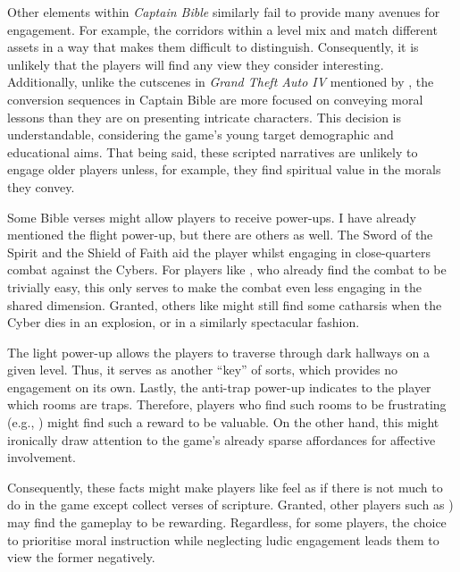 Other elements within \textit{Captain Bible} \parencite{engelbrite_captain_1994} similarly fail to provide many avenues for engagement. For example, the corridors within a level mix and match different assets in a way that makes them difficult to distinguish. Consequently, it is unlikely that the players will find any view they consider interesting. Additionally, unlike the cutscenes in \textit{Grand Theft Auto IV} \parencite{rockstar_north_grand_2008}  mentioned by \textcite[163]{calleja_in_game_2011}, the conversion sequences in Captain Bible are more focused on conveying moral lessons than they are on presenting intricate characters. This decision is understandable, considering the game's young target demographic and educational aims. That being said, these scripted narratives are unlikely to engage older players unless, for example, they find spiritual value in the morals they convey.

Some Bible verses might allow players to receive power-ups. I have already mentioned the flight power-up, but there are others as well. The Sword of the Spirit and the Shield of Faith aid the player whilst engaging in close-quarters combat against the Cybers. For players like \textcite{ace101_an_2013}, who already find the combat to be trivially easy, this only serves to make the combat even less engaging in the shared dimension. Granted, others like \textcite{annk526_captain_2024} might still find some catharsis when the Cyber dies in an explosion, or in a similarly spectacular fashion. 

The light power-up allows the players to traverse through dark hallways on a given level. Thus, it serves as another ``key'' of sorts, which provides no engagement on its own. Lastly, the anti-trap power-up indicates to the player which rooms are traps. Therefore, players who find such rooms to be frustrating (e.g., \textcite[Mechanics section, para. 8]{censorious_idler_captain_2018}) might find such a reward to be valuable. On the other hand, this might ironically draw attention to the game's already sparse affordances for affective involvement.

Consequently, these facts might make players like \textcite[The Bad section, para. 3]{turblescelbor_captain_2025} feel as if there is not much to do in the game except collect verses of scripture.
Granted, other players such as \textcite[In Retrospect section, para. 3]{censorious_idler_captain_2018}) may find the gameplay to be rewarding. Regardless, for some players, the choice to prioritise moral instruction while neglecting ludic engagement leads them to view the former negatively.

